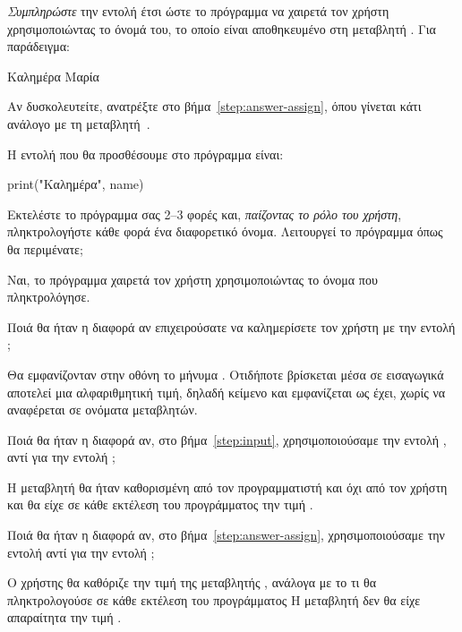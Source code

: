 \documentclass[a4paper,11pt,oneside]{book}
\begin{document}
\begin{step}
\emph{Συμπληρώστε} την εντολή  έτσι ώστε το πρόγραμμα να χαιρετά τον χρήστη χρησιμοποιώντας το όνομά του, το οποίο είναι αποθηκευμένο στη μεταβλητή . Για παράδειγμα:

\begin{pyterm}
Καλημέρα Μαρία
\end{pyterm}

Αν δυσκολευτείτε, ανατρέξτε στο βήμα~\ref{step:answer-assign}, όπου γίνεται κάτι ανάλογο με τη μεταβλητή~.

\begin{answer}
Η εντολή που θα προσθέσουμε στο πρόγραμμα είναι:

\begin{pynew}
print("Καλημέρα", name)
\end{pynew}
\end{answer}

Εκτελέστε το πρόγραμμα σας 2--3 φορές και, \emph{παίζοντας το ρόλο του χρήστη}, πληκτρολογήστε κάθε φορά ένα διαφορετικό όνομα. Λειτουργεί το πρόγραμμα όπως θα περιμένατε;

\begin{answer}
Ναι, το πρόγραμμα χαιρετά τον χρήστη χρησιμοποιώντας το όνομα που πληκτρολόγησε.
\end{answer}

Ποιά θα ήταν η διαφορά αν επιχειρούσατε να καλημερίσετε τον χρήστη με την εντολή ;

\begin{answer}
Θα εμφανίζονταν στην οθόνη το μήνυμα . Οτιδήποτε βρίσκεται μέσα σε εισαγωγικά αποτελεί μια αλφαριθμητική τιμή, δηλαδή κείμενο και εμφανίζεται ως έχει, χωρίς να αναφέρεται σε ονόματα μεταβλητών.
\end{answer}

Ποιά θα ήταν η διαφορά αν, στο βήμα~\ref{step:input}, χρησιμοποιούσαμε την εντολή , αντί για την εντολή ;

\begin{answer}
Η μεταβλητή  θα ήταν καθορισμένη από τον προγραμματιστή και όχι από τον χρήστη και θα είχε σε κάθε εκτέλεση του προγράμματος την τιμή .
\end{answer}

Ποιά θα ήταν η διαφορά αν, στο βήμα~\ref{step:answer-assign}, χρησιμοποιούσαμε την εντολή  αντί για την εντολή ;

\begin{answer}
Ο χρήστης θα καθόριζε την τιμή της μεταβλητής , ανάλογα με το τι θα πληκτρολογούσε σε κάθε εκτέλεση του προγράμματος Η μεταβλητή  δεν θα είχε απαραίτητα την τιμή .
\end{answer}
\end{step}
\end{document}
